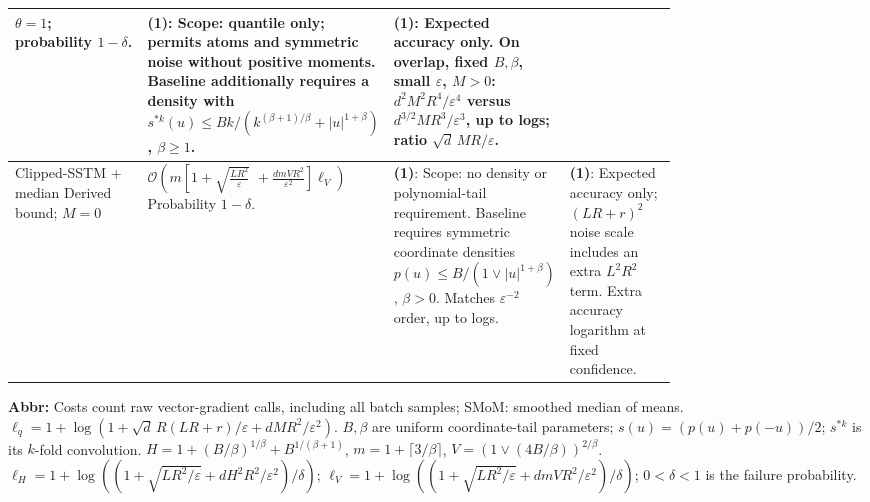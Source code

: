\begin{table}[tp]
\begin{threeparttable}
\begin{tabularx}{\linewidth}{@{}>{\raggedright\arraybackslash}p{0.20\linewidth}>{\raggedright\arraybackslash}p{0.32\linewidth}>{\raggedright\arraybackslash}p{0.25\linewidth}>{\raggedright\arraybackslash}X@{}}
$\theta=1$; probability $1-\delta$. &
\textbf{(1)}: Scope: quantile only; permits atoms and symmetric noise without positive moments. Baseline additionally requires a density with $s^{*k}(u)\le Bk/(k^{(\beta+1)/\beta}+|u|^{1+\beta})$, $\beta\ge1$. &
\textbf{(1)}: Expected accuracy only. On overlap, fixed $B,\beta$, small $\varepsilon$, $M>0$: $d^2M^2R^4/\varepsilon^4$ versus $d^{3/2}MR^3/\varepsilon^3$, up to logs; ratio $\sqrt d\,MR/\varepsilon$. \\
\midrule
Clipped-SSTM + median \citep[Prop.~4.1, Thm.~5.7, Eqs.~(18), (117)]{qsrcPuchkin2024v2}\newline Derived bound; $M=0$ &
$\mathcal{O}\!\left(m\left[1+\sqrt{\frac{LR^2}{\varepsilon}}\right.\right.$\newline
$\left.\left.{}+\frac{dmVR^2}{\varepsilon^2}\right]\ell_V\right)$\newline Probability $1-\delta$. &
\textbf{(1)}: Scope: no density or polynomial-tail requirement. Baseline requires symmetric coordinate densities $p(u)\le B/(1\vee|u|^{1+\beta})$, $\beta>0$. Matches $\varepsilon^{-2}$ order, up to logs. &
\textbf{(1)}: Expected accuracy only; $(LR+r)^2$ noise scale includes an extra $L^2R^2$ term. Extra accuracy logarithm at fixed confidence. \\
\bottomrule
\end{tabularx}
\begin{tablenotes}[flushleft]\footnotesize
\item[] \textbf{Abbr:} Costs count raw vector-gradient calls, including all batch samples; SMoM: smoothed median of means. $\ell_q=1+\log(1+\sqrt d\,R(LR+r)/\varepsilon+dMR^2/\varepsilon^2)$.
$B,\beta$ are uniform coordinate-tail parameters; $s(u)=(p(u)+p(-u))/2$; $s^{*k}$ is its $k$-fold convolution.
$H=1+(B/\beta)^{1/\beta}+B^{1/(\beta+1)}$, $m=1+\lceil3/\beta\rceil$, $V=(1\vee(4B/\beta))^{2/\beta}$.
$\ell_H=1+\log((1+\sqrt{LR^2/\varepsilon}+dH^2R^2/\varepsilon^2)/\delta)$;
$\ell_V=1+\log((1+\sqrt{LR^2/\varepsilon}+dmVR^2/\varepsilon^2)/\delta)$; $0<\delta<1$ is the failure probability.
\end{tablenotes}
\end{threeparttable}
\end{table}
\clearpage
